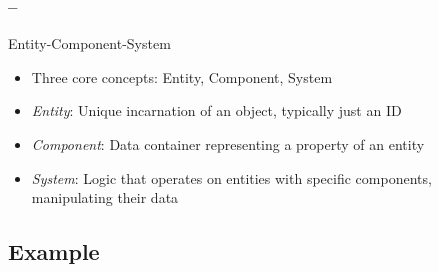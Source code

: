 \begin{frame}
    \frametitle{\insertsection{} -- \insertsubsection{}}

    \begin{fancycolumns}[widths={40,60}]
        \begin{definition}{Entity-Component-System}
            \begin{itemize}
                \item Three core concepts: Entity, Component, System
                \item \emph{Entity}: Unique incarnation of an object, typically just an ID
                \item \emph{Component}: Data container representing a property of an entity
                \item \emph{System}: Logic that operates on entities with specific components, manipulating their data
            \end{itemize}
        \end{definition}
        \nextcolumn
    \end{fancycolumns}
\end{frame}

\subsection{Example}

